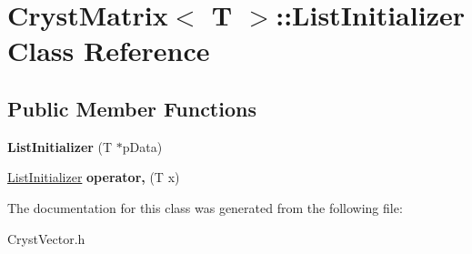 \hypertarget{class_cryst_matrix_1_1_list_initializer}{}\section{Cryst\+Matrix$<$ T $>$\+::List\+Initializer Class Reference}
\label{class_cryst_matrix_1_1_list_initializer}
\subsection*{Public Member Functions}
\begin{DoxyCompactItemize}
\item 
\mbox{\label{class_cryst_matrix_1_1_list_initializer_a417215e35036cf01f66bfa6abe3a773b}} 
{\bfseries List\+Initializer} (T $\ast$p\+Data)
\item 
\mbox{\label{class_cryst_matrix_1_1_list_initializer_a933fec882d2883fe5cc2adceff3cba2e}} 
\mbox{\hyperlink{class_cryst_matrix_1_1_list_initializer}{List\+Initializer}} {\bfseries operator,} (T x)
\end{DoxyCompactItemize}


The documentation for this class was generated from the following file\+:\begin{DoxyCompactItemize}
\item 
Cryst\+Vector.\+h\end{DoxyCompactItemize}
